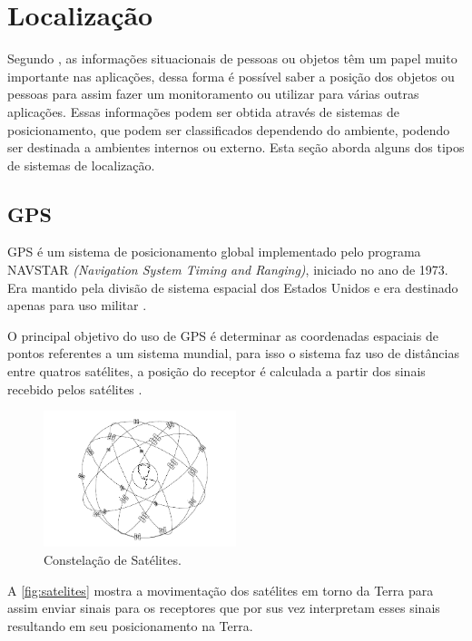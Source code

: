 \section{Localização}
\par
Segundo \citeauthor{rfid2009review}, as informações situacionais de pessoas ou objetos têm um papel muito importante nas aplicações, dessa forma é possível saber a posição dos objetos ou pessoas para assim fazer um monitoramento ou utilizar para várias outras aplicações. Essas informações podem ser obtida através de sistemas de posicionamento, que podem ser classificados dependendo do ambiente, podendo ser destinada a ambientes internos ou externo. Esta seção aborda alguns dos tipos de sistemas de localização.
    \subsection{GPS}
    \par
    GPS é um sistema de posicionamento global implementado pelo programa NAVSTAR \textit{(Navigation System Timing and Ranging)}, iniciado no ano de 1973. Era mantido pela divisão de sistema espacial dos Estados Unidos e era destinado apenas para uso militar \cite{gpsEduardo2005}.
    \par
   O principal objetivo do uso de GPS é determinar as coordenadas espaciais de pontos referentes a um sistema mundial, para isso o sistema faz uso de distâncias entre quatros satélites, a posição do receptor é calculada a partir dos sinais recebido pelos satélites \cite{gpsEduardo2005}.

   \begin{figure}[H]
              \caption{\label{fig:satelites}{Constelação de Satélites.}}
              \centering
              \includegraphics[width=0.5\textwidth]{Figuras/gps_satelites.PNG}
        \end{figure}
        \par
        A  \autoref{fig:satelites} mostra a movimentação dos satélites em torno da Terra para assim enviar sinais para os receptores que por sus vez interpretam esses sinais resultando em seu posicionamento na Terra.
 
